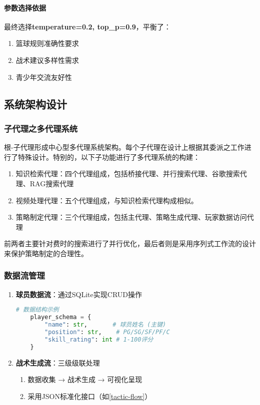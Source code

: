 \documentclass{article}
\theoremstyle{plain}
\theoremstyle{definition}
\theoremstyle{remark}
\begin{document}
\paragraph{参数选择依据}
最终选择\textbf{temperature=0.2, top\_p=0.9}，平衡了：
\begin{enumerate}
\item 篮球规则准确性要求
\item 战术建议多样性需求
\item 青少年交流友好性
\end{enumerate}


\subsection{系统架构设计}

\subsubsection{子代理之多代理系统}

根-子代理形成中心型多代理系统架构。每个子代理在设计上根据其委派之工作进行了特殊设计。特别的，以下子功能进行了多代理系统的构建：

\begin{enumerate}
    \item 知识检索代理：四个代理组成，包括桥接代理、并行搜索代理、谷歌搜索代理、RAG搜索代理
    \item 视频处理代理：五个代理组成，与知识检索代理构成相似。
    \item 策略制定代理：三个代理组成，包括主代理、策略生成代理、玩家数据访问代理
\end{enumerate}

前两者主要针对费时的搜索进行了并行优化，最后者则是采用序列式工作流的设计来保护策略制定的合理性。


\subsubsection{数据流管理}
\begin{enumerate}
    \item \textbf{球员数据流}：通过SQLite实现CRUD操作
    \begin{lstlisting}[language=Python]
    # 数据结构示例
    player_schema = {
        "name": str,       # 球员姓名 (主键)
        "position": str,    # PG/SG/SF/PF/C
        "skill_rating": int # 1-100评分
    }
    \end{lstlisting}
    
    \item \textbf{战术生成流}：三级级联处理
    \begin{enumerate}
        \item 数据收集 → 战术生成 → 可视化呈现
        \item 采用JSON标准化接口（如\cref{tactic-flow}）
    \end{enumerate}
\end{enumerate}
\end{document}
